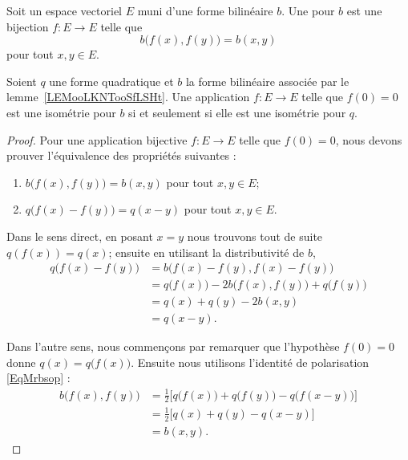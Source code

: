 \begin{definition}      \label{DEFooIQURooMeQuqX}
	Soit un espace vectoriel \( E\) muni d'une forme bilinéaire \( b\). Une  pour \( b\) est une bijection \( f\colon E\to E\) telle que
	\begin{equation}
		b\big( f(x),f(y) \big)=b(x,y)
	\end{equation}
	pour tout \( x,y\in E\).
\end{definition}

\begin{lemma}   \label{LemewGJmM}
	Soient \( q\) une forme quadratique et \( b\) la forme bilinéaire associée par le lemme~\ref{LEMooLKNTooSfLSHt}. Une application \( f\colon E\to E\) telle que \( f(0)=0\) est une isométrie pour \( b\) si et seulement si elle est une isométrie pour \( q\).
\end{lemma}

\begin{proof}
	Pour une application bijective \( f\colon E\to E\) telle que \( f(0)=0\), nous devons prouver l'équivalence des propriétés suivantes :
	\begin{enumerate}
		\item
		      \( b\big( f(x),f(y) \big)=b(x,y)\) pour tout \( x,y\in E\);
		\item
		      \( q\big( f(x)-f(y) \big)=q(x-y)\) pour tout \( x,y\in E\).
	\end{enumerate}

	Dans le sens direct, en posant \( x=y\) nous trouvons tout de suite \( q(f(x))=q(x)\); ensuite en utilisant la distributivité de \( b\),
	\begin{subequations}
		\begin{align}
			q\big( f(x)-f(y) \big) & =b\big( f(x)-f(y),f(x)-f(y) \big)                            \\
			                       & =q\big( f(x) \big)-2b\big( f(x),f(y) \big)+q\big( f(y) \big) \\
			                       & =q(x)+q(y)-2b(x,y)                                           \\
			                       & =q(x-y).
		\end{align}
	\end{subequations}

	Dans l'autre sens, nous commençons par remarquer que l'hypothèse \( f(0)=0\) donne \( q(x)=q\big( f(x) \big)\). Ensuite nous utilisons l'identité de polarisation \eqref{EqMrbsop} :
	\begin{subequations}
		\begin{align}
			b\big( f(x),f(y) \big) & =\frac{ 1 }{2}\big[ q\big( f(x) \big)+q\big( f(y) \big)-q\big( f(x-y) \big) \big] \\
			                       & =\frac{ 1 }{2}\big[ q(x)+q(y)-q(x-y) \big]                                        \\
			                       & =b(x,y).
		\end{align}
	\end{subequations}
\end{proof}

